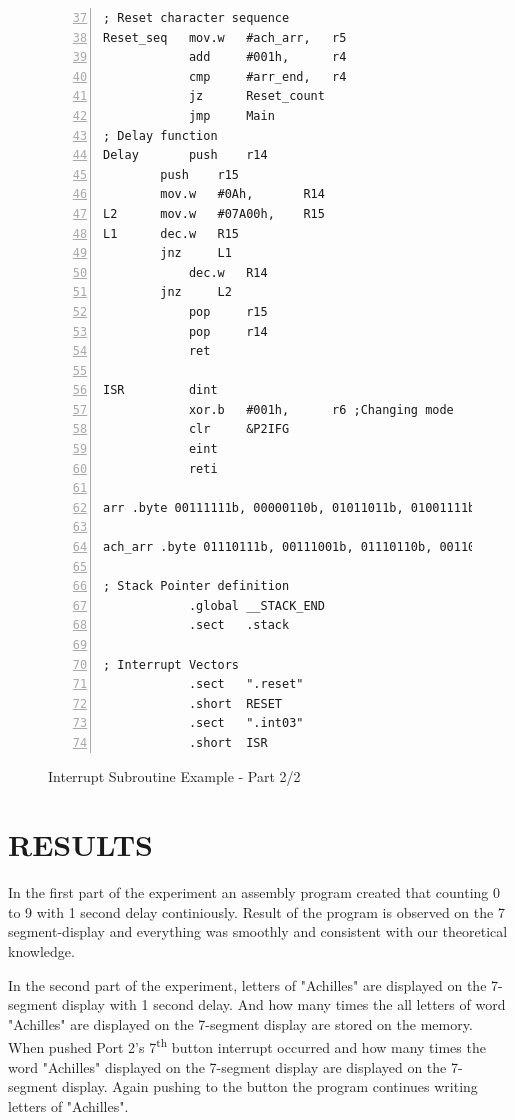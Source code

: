 \documentclass[pdftex,12pt,a4paper]{article}
\begin{document}
\begin{figure}[H]
    \centering
\begin{lstlisting}[language={[x86masm]Assembler}, firstnumber=37, numbers=left]
; Reset character sequence
Reset_seq   mov.w   #ach_arr,   r5
            add     #001h,      r4
            cmp     #arr_end,   r4
            jz      Reset_count
            jmp     Main
; Delay function
Delay	    push    r14
	    push    r15
	    mov.w   #0Ah,       R14
L2	    mov.w   #07A00h,    R15
L1	    dec.w   R15
	    jnz     L1
    	    dec.w   R14
	    jnz     L2
    	    pop     r15
    	    pop     r14
    	    ret

ISR         dint
            xor.b   #001h,      r6 ;Changing mode
            clr     &P2IFG
            eint
            reti

arr .byte 00111111b, 00000110b, 01011011b, 01001111b, 01100110b, 01101101b, 01111101b, 00000111b, 01111111b, 01101111b arr_end

ach_arr .byte 01110111b, 00111001b, 01110110b, 00110000b, 00111000b, 00111000b, 01111001b, 01101101b ach_end

; Stack Pointer definition
            .global __STACK_END
            .sect   .stack
            
; Interrupt Vectors
            .sect   ".reset"
            .short  RESET
            .sect   ".int03"
            .short  ISR
\end{lstlisting}
    \caption{Interrupt Subroutine Example - Part 2/2}
    \label{code:interrupt_2}
\end{figure}

\newpage

\section{RESULTS}%
In the first part of the experiment an assembly program created that counting 0 to 9 with 1 second delay continiously. Result of the program is observed on the 7 segment-display and everything was smoothly and consistent with our theoretical knowledge.

In the second part of the experiment, letters of "Achilles" are displayed on the 7-segment display with 1 second delay. And how many times the all letters of word "Achilles" are displayed on the 7-segment display are stored on the memory. When pushed Port 2's 7\textsuperscript{th} button interrupt occurred and how many times the word "Achilles" displayed on the 7-segment display are displayed on the 7-segment display. Again pushing to the button the program continues writing letters of "Achilles". 
\end{document}

